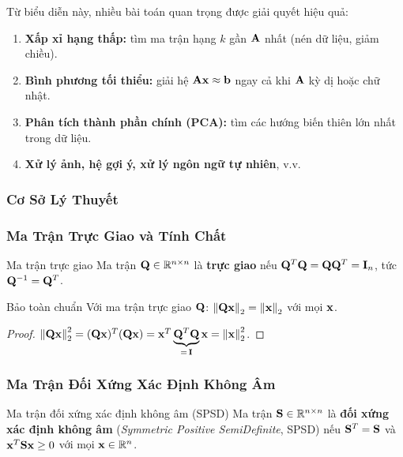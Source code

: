 \vspace{0.5em}
Từ biểu diễn này, nhiều bài toán quan trọng được giải quyết hiệu quả:
\begin{enumerate}[noitemsep]
    \item \textbf{Xấp xỉ hạng thấp:} tìm ma trận hạng $k$ gần $\mathbf{A}$ nhất
          (nén dữ liệu, giảm chiều).
    \item \textbf{Bình phương tối thiểu:} giải hệ $\mathbf{A}\mathbf{x} \approx \mathbf{b}$
          ngay cả khi $\mathbf{A}$ kỳ dị hoặc chữ nhật.
    \item \textbf{Phân tích thành phần chính (PCA):} tìm các hướng biến thiên lớn
          nhất trong dữ liệu.
    \item \textbf{Xử lý ảnh, hệ gợi ý, xử lý ngôn ngữ tự nhiên}, v.v.
\end{enumerate}

\subsubsection{Cơ Sở Lý Thuyết}

\subsubsection{Ma Trận Trực Giao và Tính Chất}

\begin{mydef}{Ma trận trực giao}{}
Ma trận $\mathbf{Q} \in \mathbb{R}^{n \times n}$ là \textbf{trực giao} nếu
$\mathbf{Q}^T\mathbf{Q} = \mathbf{Q}\mathbf{Q}^T = \mathbf{I}_n$, tức $\mathbf{Q}^{-1} = \mathbf{Q}^T$.
\end{mydef}

\begin{mythm}{Bảo toàn chuẩn}{}
Với ma trận trực giao $\mathbf{Q}$: $\left\lVert\mathbf{Q}\mathbf{x}\right\rVert_2 = \left\lVert\mathbf{x}\right\rVert_2$ với
mọi $\mathbf{x}$.
\end{mythm}

\begin{proof}
$\left\lVert\mathbf{Q}\mathbf{x}\right\rVert_2^2 = (\mathbf{Q}\mathbf{x})^T(\mathbf{Q}\mathbf{x}) =
\mathbf{x}^T\underbrace{\mathbf{Q}^T\mathbf{Q}}_{=\,\mathbf{I}}\mathbf{x} = \left\lVert\mathbf{x}\right\rVert_2^2$.
\end{proof}

\subsubsection{Ma Trận Đối Xứng Xác Định Không Âm}

\begin{mydef}{Ma trận đối xứng xác định không âm (SPSD)}{}
Ma trận $\mathbf{S} \in \mathbb{R}^{n \times n}$ là \textbf{đối xứng xác định không âm}
(\textit{Symmetric Positive SemiDefinite}, SPSD) nếu $\mathbf{S}^T = \mathbf{S}$ và
$\mathbf{x}^T\mathbf{S}\mathbf{x} \geq 0$ với mọi $\mathbf{x} \in \mathbb{R}^n$.
\end{mydef}

